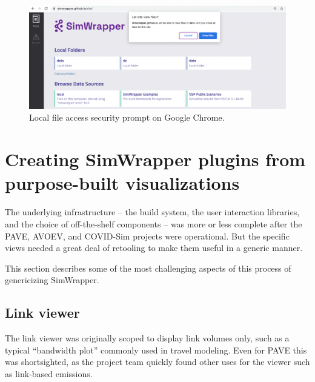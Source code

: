 \begin{figure}[ht]
  \centering
  \includegraphics[width=0.8\linewidth]{chapters/31-simwrapper/images/chrome-access.png}
  \caption{Local file access security prompt on Google Chrome.}
  \label{fig:simwrapper-chrome}
\end{figure}


\hypertarget{simwrapper-converting-purpose-built-visualizations-into-generic-data-viewers}{%
\section{Creating SimWrapper plugins from purpose-built visualizations}
\label{simwrapper-converting-purpose-built-visualizations-into-generic-data-viewers}}

The underlying infrastructure -- the build system, the user interaction libraries, and the choice of off-the-shelf components -- was more or less complete after the PAVE, AVOEV, and COVID-Sim projects were operational. But the specific views needed a great deal of retooling to make them useful in a generic manner.

This section describes some of the most challenging aspects of this process of genericizing SimWrapper.


\hypertarget{simwrapper-link-viewer}{%
\subsection{Link viewer}\label{simwrapper-link-viewer}}

The link viewer was originally scoped to display link volumes only, such as a typical ``bandwidth plot'' commonly used in travel modeling. Even for PAVE this was shortsighted, as the project team quickly found other uses for the viewer such as link-based emissions.

